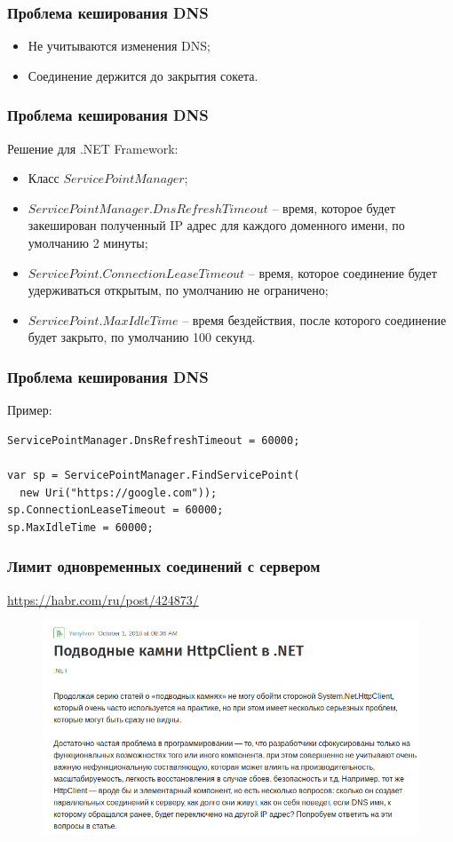 \documentclass{beamer}
\begin{document}
\begin{frame}
\frametitle{Проблема кеширования DNS}
\begin{itemize}
	\item Не учитываются изменения DNS;
	\item Соединение держится до закрытия сокета.
\end{itemize}
\end{frame}

\begin{frame}
\frametitle{Проблема кеширования DNS}
Решение для .NET Framework:
\begin{itemize}
	\item Класс $ServicePointManager$;
	\item $ServicePointManager.DnsRefreshTimeout$ -- время, которое будет закеширован полученный IP адрес для каждого доменного имени, по умолчанию 2 минуты;
	\item $ServicePoint.ConnectionLeaseTimeout$ -- время, которое соединение будет удерживаться открытым, по умолчанию не ограничено;
	\item $ServicePoint.MaxIdleTime$ -- время бездействия, после которого соединение будет закрыто, по умолчанию 100 секунд.
\end{itemize}
\end{frame}

\begin{frame}[fragile]
\frametitle{Проблема кеширования DNS}
Пример:
\\
\begin{lstlisting}
ServicePointManager.DnsRefreshTimeout = 60000;

var sp = ServicePointManager.FindServicePoint(
  new Uri("https://google.com"));
sp.ConnectionLeaseTimeout = 60000;
sp.MaxIdleTime = 60000;
\end{lstlisting}
\end{frame}

\begin{frame}
\frametitle{Лимит одновременных соединений с сервером}
\href{https://habr.com/ru/post/424873/}{https://habr.com/ru/post/424873/}
\begin{figure}
\includegraphics[scale=0.4]{habr}
\end{figure}
\end{frame}
\end{document}
